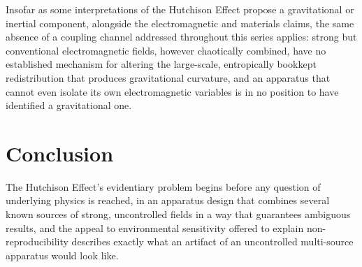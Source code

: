 \documentclass[11pt]{article}
\begin{document}
Insofar as some interpretations of the Hutchison Effect propose a gravitational or inertial component, alongside the electromagnetic and materials claims, the same absence of a coupling channel addressed throughout this series applies: strong but conventional electromagnetic fields, however chaotically combined, have no established mechanism for altering the large-scale, entropically bookkept redistribution that produces gravitational curvature, and an apparatus that cannot even isolate its own electromagnetic variables is in no position to have identified a gravitational one.

\section{Conclusion}

The Hutchison Effect's evidentiary problem begins before any question of underlying physics is reached, in an apparatus design that combines several known sources of strong, uncontrolled fields in a way that guarantees ambiguous results, and the appeal to environmental sensitivity offered to explain non-reproducibility describes exactly what an artifact of an uncontrolled multi-source apparatus would look like.
\end{document}
